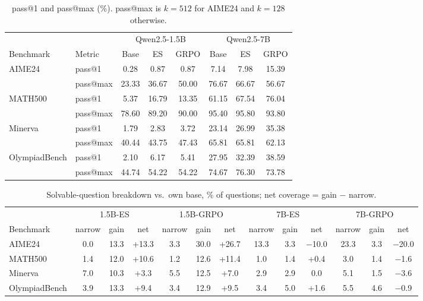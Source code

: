 \documentclass[10pt]{article}
\begin{document}
\begin{table}[H]\centering\small
\setlength{\tabcolsep}{4pt}
\begin{tabular}{llcccccc}\toprule
 & & \multicolumn{3}{c}{Qwen2.5-1.5B} & \multicolumn{3}{c}{Qwen2.5-7B}\\\cmidrule(lr){3-5}\cmidrule(lr){6-8}
Benchmark & Metric & Base & ES & GRPO & Base & ES & GRPO\\\midrule
AIME24 & pass@1 & 0.28 & 0.87 & 0.87 & 7.14 & 7.98 & 15.39\\
 & pass@max & 23.33 & 36.67 & 50.00 & 76.67 & 66.67 & 56.67\\
MATH500 & pass@1 & 5.37 & 16.79 & 13.35 & 61.15 & 67.54 & 76.04\\
 & pass@max & 78.60 & 89.20 & 90.00 & 95.40 & 95.80 & 93.80\\
Minerva & pass@1 & 1.79 & 2.83 & 3.72 & 23.14 & 26.99 & 35.38\\
 & pass@max & 40.44 & 43.75 & 47.43 & 65.81 & 65.81 & 62.13\\
OlympiadBench & pass@1 & 2.10 & 6.17 & 5.41 & 27.95 & 32.39 & 38.59\\
 & pass@max & 44.74 & 54.22 & 54.22 & 74.67 & 76.30 & 73.78\\\bottomrule
\end{tabular}
\caption{pass@1 and pass@max (\%). pass@max is $k=512$ for AIME24 and $k=128$ otherwise.}\label{tab:passk}
\end{table}

\begin{table}[H]\centering\small
\setlength{\tabcolsep}{4pt}
\begin{tabular}{lcccccccccccc}\toprule
 & \multicolumn{3}{c}{1.5B-ES} & \multicolumn{3}{c}{1.5B-GRPO} & \multicolumn{3}{c}{7B-ES} & \multicolumn{3}{c}{7B-GRPO}\\
\cmidrule(lr){2-4}\cmidrule(lr){5-7}\cmidrule(lr){8-10}\cmidrule(lr){11-13}
Benchmark & narrow & gain & net & narrow & gain & net & narrow & gain & net & narrow & gain & net\\\midrule
AIME24 & 0.0 & 13.3 & +13.3 & 3.3 & 30.0 & +26.7 & 13.3 & 3.3 & $-$10.0 & 23.3 & 3.3 & $-$20.0\\
MATH500 & 1.4 & 12.0 & +10.6 & 1.2 & 12.6 & +11.4 & 1.0 & 1.4 & +0.4 & 3.0 & 1.4 & $-$1.6\\
Minerva & 7.0 & 10.3 & +3.3 & 5.5 & 12.5 & +7.0 & 2.9 & 2.9 & 0.0 & 5.1 & 1.5 & $-$3.6\\
OlympiadBench & 3.9 & 13.3 & +9.4 & 3.4 & 12.9 & +9.5 & 3.4 & 5.0 & +1.6 & 5.5 & 4.6 & $-$0.9\\\bottomrule
\end{tabular}
\caption{Solvable-question breakdown vs.\ own base, \% of questions; net coverage = gain $-$ narrow.}\label{tab:solv}
\end{table}
\end{document}
